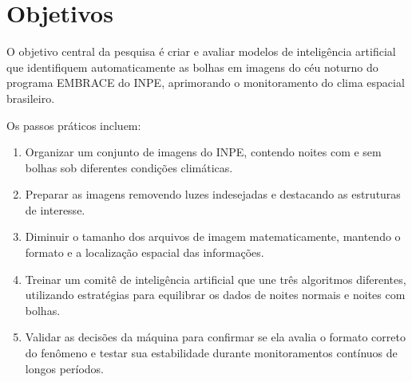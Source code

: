 \section{Objetivos}\label{sec:objectives}

O objetivo central da pesquisa é criar e avaliar modelos de inteligência artificial que identifiquem automaticamente as bolhas em imagens do céu noturno do programa EMBRACE do INPE, aprimorando o monitoramento do clima espacial brasileiro.

Os passos práticos incluem:
\begin{enumerate}
   \item Organizar um conjunto de imagens do INPE, contendo noites com e sem bolhas sob diferentes condições climáticas.
   \item Preparar as imagens removendo luzes indesejadas e destacando as estruturas de interesse.
   \item Diminuir o tamanho dos arquivos de imagem matematicamente, mantendo o formato e a localização espacial das informações.
   \item Treinar um comitê de inteligência artificial que une três algoritmos diferentes, utilizando estratégias para equilibrar os dados de noites normais e noites com bolhas.
   \item Validar as decisões da máquina para confirmar se ela avalia o formato correto do fenômeno e testar sua estabilidade durante monitoramentos contínuos de longos períodos.
\end{enumerate}